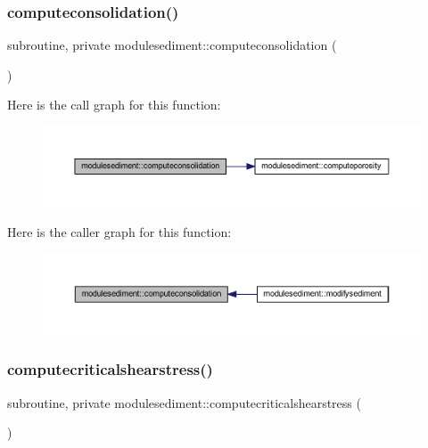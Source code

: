 \subsubsection{\texorpdfstring{computeconsolidation()}{computeconsolidation()}}
{\footnotesize\ttfamily subroutine, private modulesediment\+::computeconsolidation (\begin{DoxyParamCaption}{ }\end{DoxyParamCaption})\hspace{0.3cm}{\ttfamily [private]}}

Here is the call graph for this function\+:\nopagebreak
\begin{figure}[H]
\begin{center}
\leavevmode
\includegraphics[width=350pt]{namespacemodulesediment_a513f33f980769b37c74ea34212fad388_cgraph}
\end{center}
\end{figure}
Here is the caller graph for this function\+:\nopagebreak
\begin{figure}[H]
\begin{center}
\leavevmode
\includegraphics[width=350pt]{namespacemodulesediment_a513f33f980769b37c74ea34212fad388_icgraph}
\end{center}
\end{figure}
\mbox{\label{namespacemodulesediment_a04e890023555f00803b6373c6f8934cc}} 
\subsubsection{\texorpdfstring{computecriticalshearstress()}{computecriticalshearstress()}}
{\footnotesize\ttfamily subroutine, private modulesediment\+::computecriticalshearstress (\begin{DoxyParamCaption}{ }\end{DoxyParamCaption})\hspace{0.3cm}{\ttfamily [private]}}

